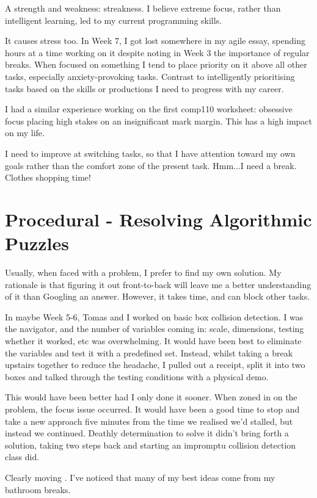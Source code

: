 \documentclass{scrartcl}
\begin{document}
A strength and weakness: streakness. I believe extreme focus, rather than intelligent learning, led to my current programming skills.

It causes stress too. In Week 7, I got lost somewhere in my agile essay, spending hours at a time working on it despite noting in Week 3 the importance of regular breaks. When focused on something I tend to place priority on it above all other tasks, especially anxiety-provoking tasks. Contrast to intelligently prioritising tasks based on the skills or productions I need to progress with my career.

I had a similar experience working on the first comp110 worksheet: obsessive focus placing high stakes on an insignificant mark margin. This has a high impact on my life.

I need to improve at switching tasks, so that I have attention toward my own goals rather than the comfort zone of the present task. Hmm...I need a break. Clothes shopping time!

\section{Procedural - Resolving Algorithmic Puzzles}

Usually, when faced with a problem, I prefer to find my own solution. My rationale is that figuring it out front-to-back will leave me a better understanding of it than Googling an answer. However, it takes time, and can block other tasks.

In maybe Week 5-6, Tomas and I worked on basic box collision detection. I was the navigator, and the number of variables coming in: scale, dimensions, testing whether it worked, etc was overwhelming. It would have been best to eliminate the variables and test it with a predefined set. Instead, whilst taking a break upstairs together to reduce the headache, I pulled out a receipt, split it into two boxes and talked  through the testing conditions with a physical demo.

This would have been better had I only done it sooner. When zoned in on the problem, the focus issue occurred. It would have been a good time to stop and take a new approach five minutes from the time we realised we'd stalled, but instead we continued. Deathly determination to solve it didn't bring forth a solution, taking two steps back and starting an impromptu collision detection class did.

Clearly moving . I've noticed that many of my best ideas come from my bathroom breaks. 
\end{document}
